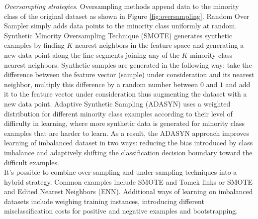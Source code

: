 \textit{Oversampling strategies}. Oversampling methods append data to the minority class of the original dataset as shown in Figure \ref{fig:oversampling}. Random Over Sampler simply adds data points to the minority class uniformly at random. Synthetic Minority Oversampling Technique (SMOTE) generates synthetic examples by finding $K$ nearest neighbors in the feature space and generating a new data point along the line segments joining any of the $K$ minority class nearest neighbors. Synthetic samples are generated in the following way: take the difference between the feature vector (sample) under consideration and its nearest neighbor, multiply this difference by a random number between $0$ and $1$ and add it to the feature vector under consideration thus augmenting the dataset with a new data point. Adaptive Synthetic Sampling (ADASYN) uses a weighted distribution for different minority class examples according to their level of difficulty in learning, where more synthetic data is generated for minority class examples that are harder to learn. As a result, the ADASYN approach improves learning of imbalanced dataset in two ways: reducing the bias introduced by class imbalance and adaptively shifting the classification decision boundary toward the difficult examples.\\ 

It's possible to combine over-sampling and under-sampling techniques into a hybrid strategy. Common examples include SMOTE and Tomek links or SMOTE and Edited Nearest Neighbors (ENN). Additional ways of learning on imbalanced datasets include weighing training instances, introducing different misclassification costs for positive and negative examples and bootstrapping. 





